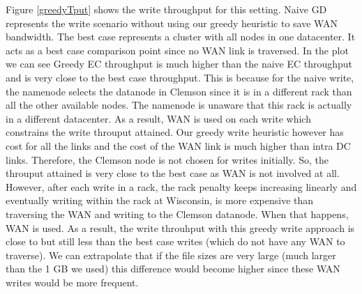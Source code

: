 \documentclass{sig-alternate-05-2015}
\begin{document}
Figure \ref{greedyTput} shows the write throughput for this setting. Naive GD represents the write scenario without using our greedy heuristic to save WAN bandwidth. The best case represents a cluster with all nodes in one datacenter. It acts as a best case comparison point since no WAN link is traversed. In the plot we can see Greedy EC throughput is much higher than the naive EC throughput and is very close to the best case throughput. This is because for the naive write, the namenode selects the datanode in Clemson since it is in a different rack than all the other available nodes. The namenode is unaware that this rack is actually in a different datacenter. As a result,  WAN is used on each write which constrains the write throuput attained. Our greedy write heuristic however has cost for all the links and the cost of the WAN link is much higher than intra DC links. Therefore, the Clemson node is not chosen for writes initially. So, the throuput attained is very close to the best case as WAN is not involved at all. However, after each write in a rack, the rack penalty keeps increasing linearly and eventually writing within the rack at Wisconsin, is more expensive than traversing the WAN and writing to the Clemson datanode. When that happens, WAN is used. As a result, the write throuhput with this greedy write approach is close to but still less than the best case writes (which do not have any WAN to traverse). We can extrapolate that if the file sizes are very large (much larger than the 1 GB we used) this difference would become higher since these WAN writes would be more frequent. 
\end{document}
